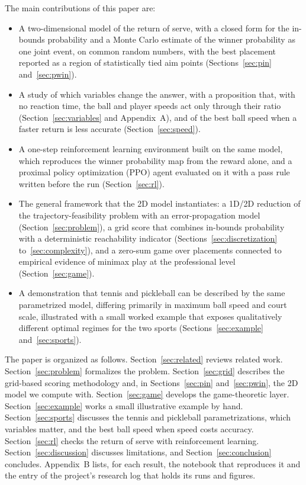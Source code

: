   The main contributions of this paper are:

  \begin{itemize}
    \item A two-dimensional model of the return of serve, with a closed form for
    the in-bounds probability and a Monte Carlo estimate of the winner
    probability as one joint event, on common random numbers, with the best
    placement reported as a region of statistically tied aim points
    (Sections~\ref{sec:pin} and~\ref{sec:pwin}).

    \item A study of which variables change the answer, with a proposition
    that, with no reaction time, the ball and player speeds act only through
    their ratio (Section~\ref{sec:variables} and Appendix~A), and of the best
    ball speed when a faster return is less accurate
    (Section~\ref{sec:speed}).

    \item A one-step reinforcement learning environment built on the same
    model, which reproduces the winner probability map from the reward alone,
    and a proximal policy optimization (PPO) agent evaluated on it with a pass
    rule written before the run (Section~\ref{sec:rl}).

    \item The general framework that the 2D model instantiates: a 1D/2D
    reduction of the trajectory-feasibility problem with an error-propagation
    model (Section~\ref{sec:problem}), a grid score that combines in-bounds
    probability with a deterministic reachability indicator
    (Sections~\ref{sec:discretization} to~\ref{sec:complexity}), and a zero-sum
    game over placements connected to empirical evidence of minimax play at the
    professional level \cite{walker2001minimax} (Section~\ref{sec:game}).

    \item A demonstration that tennis and pickleball can be described by the
    same parametrized model, differing primarily in maximum ball speed and court
    scale, illustrated with a small worked example that exposes qualitatively
    different optimal regimes for the two sports (Sections~\ref{sec:example}
    and~\ref{sec:sports}).
  \end{itemize}

  The paper is organized as follows. Section~\ref{sec:related} reviews related
  work. Section~\ref{sec:problem} formalizes the problem.
  Section~\ref{sec:grid} describes the grid-based scoring methodology and, in
  Sections~\ref{sec:pin} and~\ref{sec:pwin}, the 2D model we compute with.
  Section~\ref{sec:game} develops the game-theoretic layer.
  Section~\ref{sec:example} works a small illustrative example by hand.
  Section~\ref{sec:sports} discusses the tennis and pickleball
  parametrizations, which variables matter, and the best ball speed when speed
  costs accuracy. Section~\ref{sec:rl} checks the return of serve with
  reinforcement learning. Section~\ref{sec:discussion} discusses limitations,
  and Section~\ref{sec:conclusion} concludes. Appendix~B lists, for each
  result, the notebook that reproduces it and the entry of the project's
  research log that holds its runs and figures.

